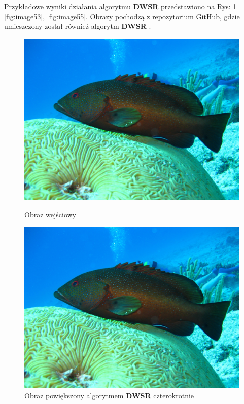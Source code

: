 Przykładowe wyniki działania algorytmu \textbf{DWSR} przedstawiono na Rys: \ref{fig:image51} \ref{fig:image53}, \ref{fig:image55}. Obrazy pochodzą z repozytorium GitHub, gdzie umieszczony został również algorytm \textbf{DWSR} \cite{guo2017deep}.
\begin{figure}[ht]
    \centering
    \begin{minipage}[t]{0.45\linewidth}
        \includegraphics[width=\linewidth]{Rozdziały/03.DWSR/Obrazy/0904x4.png}
        \caption{Obraz wejściowy}
        \label{fig:image50}
    \end{minipage}
    \hspace{0.5cm}
    \begin{minipage}[t]{0.45\linewidth}
        \includegraphics[width=\linewidth]{Rozdziały/03.DWSR/Obrazy/0904x4_DWSRx4.png}
        \caption{Obraz powiększony algorytmem \textbf{DWSR} czterokrotnie}
        \label{fig:image51}
    \end{minipage}
\end{figure}
